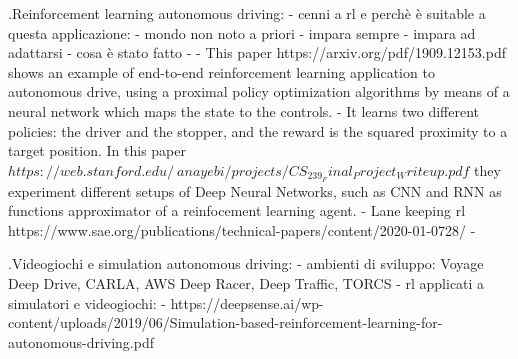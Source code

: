 .Reinforcement learning autonomous driving:
	- cenni a rl e perchè è suitable a questa applicazione:
			- mondo non noto a priori
			- impara sempre
			- impara ad adattarsi
	- cosa è stato fatto
		- 
- This paper https://arxiv.org/pdf/1909.12153.pdf shows an example of end-to-end reinforcement learning application to autonomous drive, using a proximal policy optimization algorithms by means of a neural network which maps the state to the controls. - It learns two different policies: the driver and the stopper, and the reward is the squared proximity to a target position.
In this paper $https://web.stanford.edu/~anayebi/projects/CS_239_Final_Project_Writeup.pdf$ they experiment different setups of Deep Neural Networks, such as CNN and RNN as functions approximator of a reinfocement learning agent.
- Lane keeping rl https://www.sae.org/publications/technical-papers/content/2020-01-0728/
- 


.Videogiochi e simulation autonomous driving:
	- ambienti di sviluppo:  Voyage Deep Drive, CARLA, AWS Deep Racer, Deep Traffic, TORCS	
	- rl applicati a simulatori e videogiochi:
		- https://deepsense.ai/wp-content/uploads/2019/06/Simulation-based-reinforcement-learning-for-autonomous-driving.pdf
	
	
	
	
	
	
